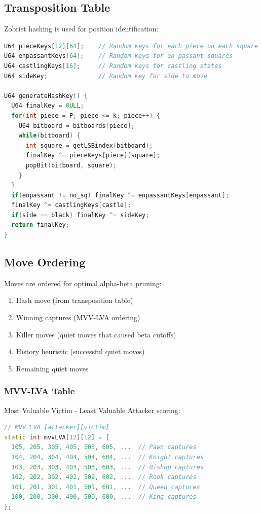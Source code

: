 \documentclass[11pt,a4paper]{report}
\begin{document}
\subsection{Transposition Table}

Zobrist hashing is used for position identification:

\begin{lstlisting}[language=C++]
U64 pieceKeys[12][64];    // Random keys for each piece on each square
U64 enpassantKeys[64];    // Random keys for en passant squares
U64 castlingKeys[16];     // Random keys for castling states
U64 sideKey;              // Random key for side to move

U64 generateHashKey() { 
  U64 finalKey = 0ULL; 
  for(int piece = P; piece <= k; piece++) { 
    U64 bitboard = bitboards[piece];
    while(bitboard) { 
      int square = getLSBindex(bitboard);
      finalKey ^= pieceKeys[piece][square];
      popBit(bitboard, square);
    }
  }
  if(enpassant != no_sq) finalKey ^= enpassantKeys[enpassant];
  finalKey ^= castlingKeys[castle];
  if(side == black) finalKey ^= sideKey;
  return finalKey;
}
\end{lstlisting}

\subsection{Move Ordering}

Moves are ordered for optimal alpha-beta pruning:

\begin{enumerate}
    \item Hash move (from transposition table)
    \item Winning captures (MVV-LVA ordering)
    \item Killer moves (quiet moves that caused beta cutoffs)
    \item History heuristic (successful quiet moves)
    \item Remaining quiet moves
\end{enumerate}

\subsubsection{MVV-LVA Table}

Most Valuable Victim - Least Valuable Attacker scoring:

\begin{lstlisting}[language=C++]
// MVV LVA [attacker][victim]
static int mvvLVA[12][12] = {
  105, 205, 305, 405, 505, 605, ...  // Pawn captures
  104, 204, 304, 404, 504, 604, ...  // Knight captures
  103, 203, 303, 403, 503, 603, ...  // Bishop captures
  102, 202, 302, 402, 502, 602, ...  // Rook captures
  101, 201, 301, 401, 501, 601, ...  // Queen captures
  100, 200, 300, 400, 500, 600, ...  // King captures
};
\end{lstlisting}
\end{document}
